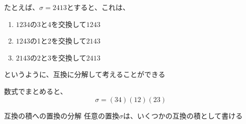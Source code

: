 \documentclass[../../../topic_linear-algebra]{subfiles}
\begin{document}
たとえば、$\sigma = 2413$とすると、これは、
\begin{enumerate}
  \item $1234$の3と4を交換して$1243$
  \item $1243$の1と2を交換して$2143$
  \item $2143$の2と3を交換して$2413$
\end{enumerate}
というように、互換に分解して考えることができる

数式でまとめると、
\begin{equation*}
  \sigma = (34)(12)(23)
\end{equation*}

\begin{theorem}{互換の積への置換の分解}
  任意の置換$\sigma$は、いくつかの互換の積として書ける
\end{theorem}
\end{document}
